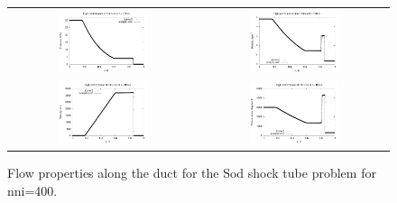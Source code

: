 \begin{figure}[htbp]
\begin{tabular}{cc}
\includegraphics[width=0.5\textwidth]{../2D/classic-shock-tube/cst-p.pdf} &
\includegraphics[width=0.5\textwidth]{../2D/classic-shock-tube/cst-rho.pdf}\\
\includegraphics[width=0.5\textwidth]{../2D/classic-shock-tube/cst-u.pdf} &
\includegraphics[width=0.5\textwidth]{../2D/classic-shock-tube/cst-T.pdf}
\end{tabular}
\caption{Flow properties along the duct for the Sod shock tube problem for nni=400.}
\label{cst-profiles-fig}
\end{figure}


